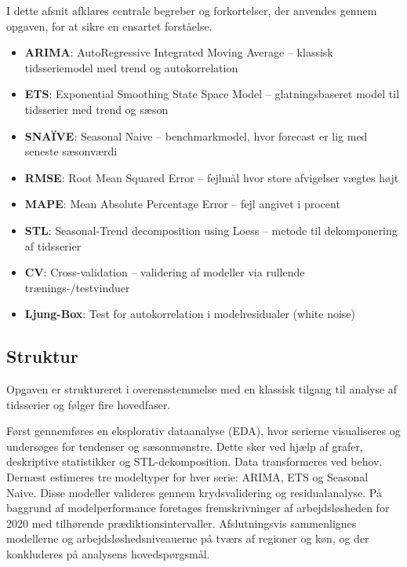\documentclass[
]{article}
\providecommand{\tightlist}{%
  \setlength{\itemsep}{0pt}\setlength{\parskip}{0pt}}\usepackage{longtable,booktabs,array}
\begin{document}
I dette afsnit afklares centrale begreber og forkortelser, der anvendes
gennem opgaven, for at sikre en ensartet forståelse.

\begin{itemize}
\tightlist
\item
  \textbf{ARIMA}: AutoRegressive Integrated Moving Average -- klassisk
  tidsseriemodel med trend og autokorrelation\\
\item
  \textbf{ETS}: Exponential Smoothing State Space Model --
  glatningsbaseret model til tidsserier med trend og sæson\\
\item
  \textbf{SNAÏVE}: Seasonal Naive -- benchmarkmodel, hvor forecast er
  lig med seneste sæsonværdi\\
\item
  \textbf{RMSE}: Root Mean Squared Error -- fejlmål hvor store
  afvigelser vægtes højt\\
\item
  \textbf{MAPE}: Mean Absolute Percentage Error -- fejl angivet i
  procent\\
\item
  \textbf{STL}: Seasonal-Trend decomposition using Loess -- metode til
  dekomponering af tidsserier\\
\item
  \textbf{CV}: Cross-validation -- validering af modeller via rullende
  trænings-/testvinduer\\
\item
  \textbf{Ljung-Box}: Test for autokorrelation i modelresidualer (white
  noise)
\end{itemize}

\subsection{Struktur}\label{struktur}

Opgaven er struktureret i overensstemmelse med en klassisk tilgang til
analyse af tidsserier og følger fire hovedfaser.

Først gennemføres en eksplorativ dataanalyse (EDA), hvor serierne
visualiseres og undersøges for tendenser og sæsonmønstre. Dette sker ved
hjælp af grafer, deskriptive statistikker og STL-dekomposition. Data
transformeres ved behov. Dernæst estimeres tre modeltyper for hver
serie: ARIMA, ETS og Seasonal Naive. Disse modeller valideres gennem
krydsvalidering og residualanalyse. På baggrund af modelperformance
foretages fremskrivninger af arbejdsløsheden for 2020 med tilhørende
prædiktionsintervaller. Afslutningsvis sammenlignes modellerne og
arbejdsløshedsniveauerne på tværs af regioner og køn, og der konkluderes
på analysens hovedspørgsmål.
\end{document}
